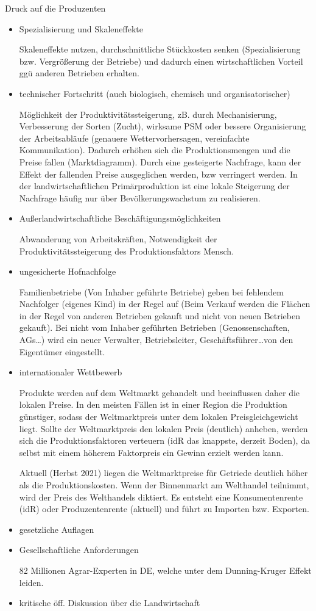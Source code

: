 \documentclass[11pt]{scrartcl}
\begin{document}
Druck auf die Produzenten
\begin{itemize}
	\item{Spezialisierung und Skaleneffekte}

		Skaleneffekte nutzen, durchschnittliche Stückkosten senken (Spezialisierung bzw. Vergrößerung der Betriebe) und dadurch einen wirtschaftlichen Vorteil ggü anderen Betrieben erhalten.
	\item{technischer Fortschritt (auch biologisch, chemisch und organisatorischer)}

		Mög\-lich\-keit der Pro\-duk\-tivi\-täts\-stei\-ger\-ung, zB. durch Mechanisierung, Verbesserung der Sorten (Zucht), wirksame \ac{PSM} oder bessere Organisierung der Arbeitsabläufe (genauere Wettervorhersagen, vereinfachte Kommunikation).
		Dadurch erhöhen sich die Produktionsmengen und die Preise fallen (Marktdiagramm).
		Durch eine gesteigerte Nachfrage, kann der Effekt der fallenden Preise ausgeglichen werden, bzw verringert werden.
		In der landwirtschaftlichen Pri\-mär\-pro\-duk\-tion ist eine lokale Steigerung der Nachfrage häu\-fig nur über Be\-völ\-ker\-ungs\-wachs\-tum zu realisieren.
	\item{Außerlandwirtschaftliche Beschäftigungsmöglichkeiten}

		Abwanderung von Arbeitskräften, Notwendigkeit der Produktivitätssteigerung des Produktionsfaktors Mensch.
	\item{ungesicherte Hofnachfolge}

		Familienbetriebe (Von Inhaber geführte Betriebe) geben bei fehlendem Nachfolger (eigenes Kind) in der Regel auf (Beim Verkauf werden die Flächen in der Regel von anderen Betrieben gekauft und nicht von neuen Betrieben gekauft).
		Bei nicht vom Inhaber geführten Betrieben (Genossenschaften, AGs\ldots) wird ein neuer Verwalter, Betriebsleiter, Geschäftsführer\ldots von den Eigentümer eingestellt.
	\item{internationaler Wettbewerb}

		Produkte werden auf dem Weltmarkt gehandelt und beeinflussen daher die lokalen Preise.
		In den meisten Fäl\-len ist in einer Region die Produktion gün\-sti\-ger, sodass der Weltmarktpreis unter dem lokalen Preisgleichgewicht liegt.
		Sollte der Weltmarktpreis den lokalen Preis (deutlich) anheben, werden sich die Produktionsfaktoren verteuern (idR das knappste, derzeit Boden), da selbst mit einem höherem Faktorpreis ein Gewinn erzielt werden kann. 

		Aktuell (Herbst 2021) liegen die Weltmarktpreise für Getriede deutlich höher als die Produktionskosten.
		Wenn der Binnenmarkt am Welthandel teilnimmt, wird der Preis des Welthandels diktiert.
		Es entsteht eine Konsumentenrente (idR) oder Produzentenrente (aktuell) und führt zu Importen bzw. Exporten.

	\item{gesetzliche Auflagen}

	\item{Gesellschaftliche Anforderungen}

		82 Millionen Agrar-Experten in DE, welche unter dem Dunning-Kruger Effekt leiden.
	\item{kritische öff. Diskussion über die Landwirtschaft}
\end{itemize}
\end{document}

